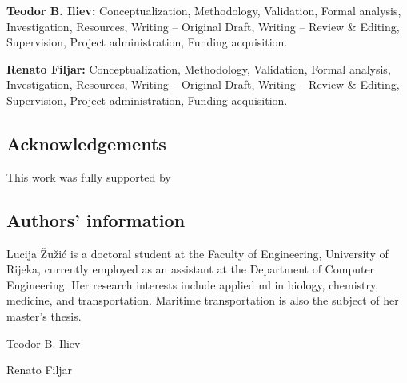 \documentclass[sn-mathphys-num]{sn-jnl}%
\begin{document}
\textbf{Teodor B. Iliev:} Conceptualization, Methodology, Validation, Formal analysis, Investigation, Resources, Writing -- Original Draft, Writing -- Review \& Editing, Supervision, Project administration, Funding acquisition.

\textbf{Renato Filjar:} Conceptualization, Methodology, Validation, Formal analysis, Investigation, Resources, Writing -- Original Draft, Writing -- Review \& Editing, Supervision, Project administration, Funding acquisition.

\subsection{Acknowledgements}

This work was fully supported by

\subsection{Authors' information}

Lucija Žužić is a doctoral student at the Faculty of Engineering, University of Rijeka, currently employed as an assistant at the Department of Computer Engineering. Her research interests include applied \acrlong{ml} in biology, chemistry, medicine, and transportation. Maritime transportation is also the subject of her master's thesis.

Teodor B. Iliev

Renato Filjar


\end{document}
